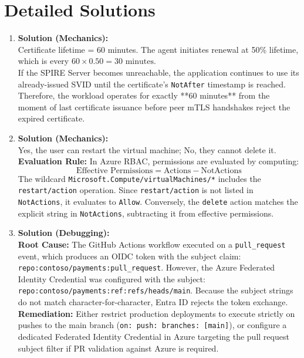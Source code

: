 \section{Detailed Solutions}
\begin{enumerate}[leftmargin=18pt]
  \item \textbf{Solution (Mechanics):}\\
  Certificate lifetime = 60 minutes. The agent initiates renewal at 50\% lifetime, which is every $60 \times 0.50 = 30 \text{ minutes}$.\\
  If the SPIRE Server becomes unreachable, the application continues to use its already-issued SVID until the certificate's \texttt{NotAfter} timestamp is reached. Therefore, the workload operates for exactly **60 minutes** from the moment of last certificate issuance before peer mTLS handshakes reject the expired certificate.

  \item \textbf{Solution (Mechanics):}\\
  Yes, the user can restart the virtual machine; No, they cannot delete it.\\
  \textbf{Evaluation Rule:} In Azure RBAC, permissions are evaluated by computing:
  \begin{equation*}
  \text{Effective Permissions} = \text{Actions} - \text{NotActions}
  \end{equation*}
  The wildcard \texttt{Microsoft.Compute/virtualMachines/*} includes the \texttt{restart/action} operation. Since \texttt{restart/action} is not listed in \texttt{NotActions}, it evaluates to \texttt{Allow}. Conversely, the \texttt{delete} action matches the explicit string in \texttt{NotActions}, subtracting it from effective permissions.

  \item \textbf{Solution (Debugging):}\\
  \textbf{Root Cause:} The GitHub Actions workflow executed on a \texttt{pull\_request} event, which produces an OIDC token with the subject claim: \texttt{repo:contoso/payments:pull\_request}. However, the Azure Federated Identity Credential was configured with the subject: \texttt{repo:contoso/payments:ref:refs/heads/main}. Because the subject strings do not match character-for-character, Entra ID rejects the token exchange.\\
  \textbf{Remediation:} Either restrict production deployments to execute strictly on pushes to the main branch (\texttt{on: push: branches: [main]}), or configure a dedicated Federated Identity Credential in Azure targeting the pull request subject filter if PR validation against Azure is required.


\end{enumerate}
